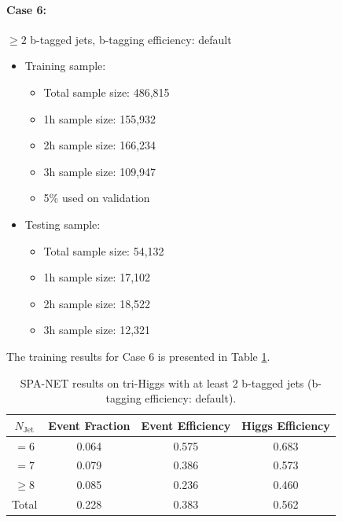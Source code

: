 \documentclass[12pt]{article}
\begin{document}
		\paragraph{Case 6:} $\ge 2$ b-tagged jets, b-tagging efficiency: default
		\begin{itemize}
			\item Training sample:
			\begin{itemize}
				\item Total sample size: 486,815
				\item 1h sample size: 155,932
				\item 2h sample size: 166,234
				\item 3h sample size: 109,947
				\item 5\% used on validation
			\end{itemize}
			\item Testing sample: 
				\begin{itemize}
					\item Total sample size: 54,132
					\item 1h sample size: 17,102
					\item 2h sample size: 18,522
					\item 3h sample size: 12,321
				\end{itemize}
		\end{itemize}
		The training results for Case 6 is presented in Table \ref{tab:SPANet_triHiggs_2btag_default}.
		\begin{table}[htpb]
			\centering
			\caption{SPA-NET results on tri-Higgs with at least 2 b-tagged jets (b-tagging efficiency: default).}
			\label{tab:SPANet_triHiggs_2btag_default}
			\begin{tabular}{c|c|cc}
				$N_\text{Jet}$ & Event Fraction & Event Efficiency & Higgs Efficiency \\
				\hline
				$=6$	  &   0.064             &    0.575              &    0.683             \\
				$=7$	  &   0.079             &    0.386              &    0.573             \\
				$\ge 8$	  &   0.085             &    0.236              &    0.460             \\
				Total	  &   0.228             &    0.383              &    0.562             \\
			\end{tabular}
		\end{table}
\end{document}

